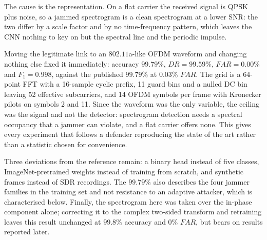 The cause is the representation.
On a flat carrier the received signal is QPSK plus noise, so a jammed spectrogram is a clean spectrogram at a lower SNR: the two differ by a scale factor and by no time-frequency pattern, which leaves the CNN nothing to key on but the spectral line and the periodic impulse.

Moving the legitimate link to an $802.11$a-like OFDM waveform and changing nothing else fixed it immediately: accuracy $99.79\%$, $DR = 99.59\%$, $FAR = 0.00\%$ and $F_1 = 0.998$, against the published $99.79\%$ at $0.03\%$ $FAR$.
The grid is a 64-point FFT with a 16-sample cyclic prefix, 11 guard bins and a nulled DC bin leaving 52 effective subcarriers, and 14 OFDM symbols per frame with Kronecker pilots on symbols 2 and 11.
Since the waveform was the only variable, the ceiling was the signal and not the detector: spectrogram detection needs a spectral occupancy that a jammer can violate, and a flat carrier offers none.
This gives every experiment that follows a defender reproducing the state of the art rather than a statistic chosen for convenience.

Three deviations from the reference remain: a binary head instead of five classes, ImageNet-pretrained weights instead of training from scratch, and synthetic frames instead of SDR recordings.
The $99.79\%$ also describes the four jammer families in the training set and not resistance to an adaptive attacker, which is characterised below.
Finally, the spectrogram here was taken over the in-phase component alone; correcting it to the complex two-sided transform and retraining leaves this result unchanged at $99.8\%$ accuracy and $0\%$ $FAR$, but bears on results reported later.
